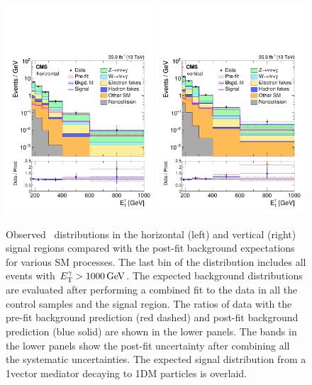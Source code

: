 \begin{figure}[htbp]
  \centering
    \includegraphics[width=0.49\textwidth]{Analysis/Figures/bonly_horizontal.pdf}
    \includegraphics[width=0.49\textwidth]{Analysis/Figures/bonly_vertical.pdf}
    \caption{
      Observed \ETg\ distributions in the horizontal (left) and vertical (right) signal regions compared with the post-fit background expectations for various SM processes.
      The last bin of the distribution includes all events with $E_{\mathrm{T}}^{\gamma} > 1000\,\text{Ge\hspace{-.08em}V}$. 
      The expected background distributions are evaluated after performing a combined fit to the data in all the control samples and the signal region. 
      The ratios of data with the pre-fit background prediction (red dashed) and post-fit background prediction (blue solid) are shown in the lower panels. 
      The bands in the lower panels show the post-fit uncertainty after combining all the systematic uncertainties. 
      The expected signal distribution from a 1\TeV vector mediator decaying to 1\GeV DM particles is overlaid.
    }
    \label{fig:postfitSR}
\end{figure}

